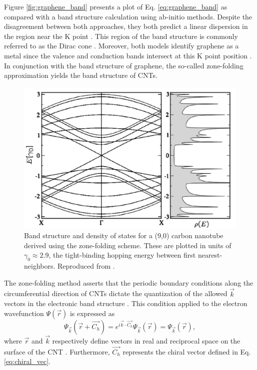Figure \ref{fig:graphene_band} presents a plot of Eq. \ref{eq:graphene_band} as compared with a band structure calculation using ab-initio methods. Despite the disagreement between both approaches, they both predict a linear dispersion in the region near the K point \cite{charlier2007electronic}. This region of the band structure is commonly referred to as the Dirac cone	\cite{charlier2007electronic}. Moreover, both models identify graphene as a metal since the valence and conduction bands intersect at this K point position \cite{charlier2007electronic}. In conjunction with the band structure of graphene, the so-called zone-folding approximation yields the band structure of CNTs. 


\begin{figure}[h]
	\centering
	\includegraphics[scale=0.36]{images/chapter_optical_props/nine_zero_band_charlier}
	\caption{Band structure and density of states for a (9,0) carbon nanotube derived using the zone-folding scheme. These are plotted in units of $\gamma_0 \approx 2.9$, the tight-binding hopping energy between first nearest-neighbors. Reproduced from \cite{charlier2007electronic}.}
	\label{fig:nine_zero_cnt}
\end{figure}

The zone-folding method asserts that the periodic boundary conditions along the circumferential direction of CNTs dictate the quantization of the allowed $\vec{k}$ vectors in the electronic band structure \cite{charlier2007electronic}. This condition applied to the electron wavefunction $\Psi(\vec{r})$ is expressed as 
\begin{equation}
 \Psi_{\vec{k}}(\vec{r} + \vec{C_h}) = e^{i \vec{k} \cdot \vec{C_h}} \Psi_{\vec{k}}(\vec{r}) = \Psi_{\vec{k}}(\vec{r}),
 \label{eq:boundary_cond}
\end{equation}
where $\vec{r}$ and $\vec{k}$ respectively define vectors in real and reciprocal space on the surface of the CNT \cite{charlier2007electronic}. Furthermore, $\vec{C_h}$ represents the chiral vector defined in Eq. \ref{eq:chiral_vec}. 

